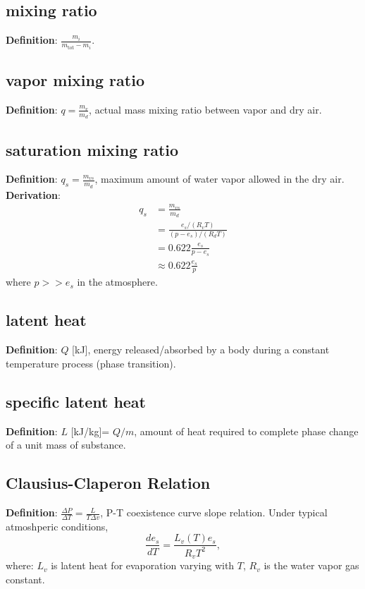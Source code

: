 \subsection{mixing ratio}
{\bf Definition}: $ \frac{m_i}{m_{\text{tot}}-m_i} $.

\subsection{vapor mixing ratio}
{\bf Definition}: $ q = \frac{m_v}{m_d}$, actual mass mixing ratio between vapor and dry air.

\subsection{saturation mixing ratio}
{\bf Definition}: $ q_s = \frac{m_{vs}}{m_d}$, maximum amount of water vapor allowed in the dry air.
{\bf Derivation}: 
\begin{equation}
\begin{aligned}
   q_s & = \frac{m_{vs}}{m_d} \\
       & = \frac{e_s/(R_v T)}{(p-e_s)/(R_dT)} \\
       & = 0.622\frac{e_s}{p-e_s} \\
       & \approx 0.622\frac{e_s}{p}
\end{aligned}
\end{equation}
where $p >> e_s$ in the atmosphere.

\subsection{latent heat}
{\bf Definition}: $Q$ [kJ], energy released/absorbed by a body during a constant temperature process
(phase transition).

\subsection{specific latent heat}
{\bf Definition}: $L$ [kJ/kg]= $Q/m$, amount of heat required to complete phase change of a unit
mass of substance.

\subsection{Clausius-Claperon Relation}
{\bf Definition}: $\frac{\Delta P}{\Delta T} = \frac{L}{T\Delta v}$, P-T coexistence curve slope
relation. Under typical atmoshperic conditions, 
\begin{equation}
   \frac{d e_s}{dT} = \frac{L_v(T)e_s}{R_vT^2}, 
\end{equation}
where: $L_v$ is latent heat for evaporation varying with $T$, $R_v$ is the water vapor gas constant.
\\


